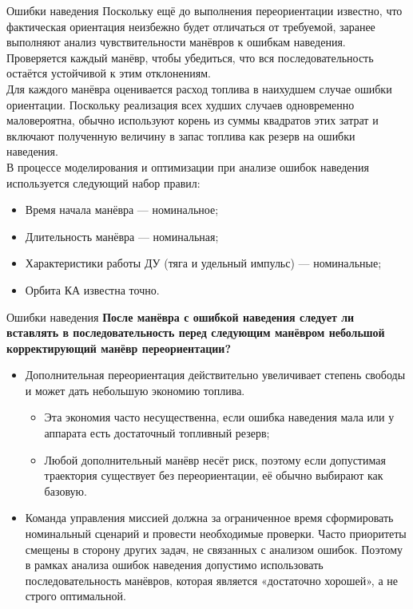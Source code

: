 \documentclass[8pt]{beamer}
\begin{document}
\begin{frame}{Ошибки наведения}
Поскольку ещё до выполнения переориентации известно, что фактическая ориентация неизбежно будет отличаться от требуемой, заранее выполняют анализ чувствительности манёвров к ошибкам наведения. Проверяется каждый манёвр, чтобы убедиться, что вся последовательность остаётся устойчивой к этим отклонениям. \\
\smallskip
Для каждого манёвра оценивается расход топлива в наихудшем случае ошибки ориентации. Поскольку реализация всех худших случаев одновременно маловероятна, обычно используют корень из суммы квадратов этих затрат и включают полученную величину в запас топлива как резерв на ошибки наведения. \\
\smallskip
В процессе моделирования и оптимизации при анализе ошибок наведения используется следующий набор правил:
\begin{itemize}
    \item Время начала манёвра — номинальное;
    \item Длительность манёвра — номинальная;
    \item Характеристики работы ДУ (тяга и удельный импульс) — номинальные;
    \item Орбита КА известна точно.
\end{itemize}
\end{frame}

\begin{frame}{Ошибки наведения}
\textbf{После манёвра с ошибкой наведения следует ли вставлять в последовательность перед следующим манёвром небольшой корректирующий манёвр переориентации?} \\
\smallskip
\begin{itemize}
    \item Дополнительная переориентация действительно увеличивает степень свободы и может дать небольшую экономию топлива.
    \begin{itemize}
        \item Эта экономия часто несущественна, если ошибка наведения мала или у аппарата есть достаточный топливный резерв;
        \item Любой дополнительный манёвр несёт риск, поэтому если допустимая траектория существует без переориентации, её обычно выбирают как базовую.
    \end{itemize}

    \item Команда управления миссией должна за ограниченное время сформировать номинальный сценарий и провести необходимые проверки. Часто приоритеты смещены в сторону других задач, не связанных с анализом ошибок. Поэтому в рамках анализа ошибок наведения допустимо использовать последовательность манёвров, которая является «достаточно хорошей», а не строго оптимальной.
\end{itemize}
\end{frame}
\end{document}
